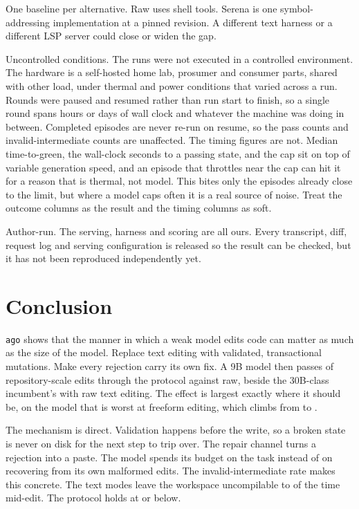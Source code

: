 \documentclass[11pt]{article}
\begin{document}
One baseline per alternative. Raw uses shell tools. Serena is one
symbol-addressing implementation at a pinned revision. A different text
harness or a different LSP server could close or widen the gap.

Uncontrolled conditions. The runs were not executed in a controlled
environment. The hardware is a self-hosted home lab, prosumer and
consumer parts, shared with other load, under thermal and power
conditions that varied across a run.
Rounds were paused and resumed rather than run start to finish, so a
single round spans hours or days of wall clock and whatever the machine
was doing in between. Completed episodes are never re-run on resume, so
the pass counts and invalid-intermediate counts are unaffected. The
timing figures are not. Median time-to-green, the wall-clock seconds to
a passing state, and the cap sit on top of variable generation speed,
and an episode that throttles near
the cap can hit it for a reason that is thermal, not model. This bites
only the episodes already close to the limit, but where a model caps
often it is a real source of noise. Treat the outcome columns as the
result and the timing columns as soft.

Author-run. The serving, harness and scoring are all ours. Every
transcript, diff, request log and serving configuration is released so
the result can be checked, but it has not been reproduced independently
yet.

\section{Conclusion}
\texttt{ago} shows that the manner in which a weak model edits code can matter as much
as the size of the model. Replace text editing with validated, transactional
mutations. Make every rejection carry its own fix. A 9B model then
passes \QwenSemanticPass{} of repository-scale edits through the
protocol against \QwenRawPass{} raw, beside the 30B-class incumbent's
\GlmRawPass{} with raw text editing. The effect
is largest exactly where it should be, on the model that is worst at
freeform editing, which climbs from \GptOssRawPass{} to
\GptOssSemanticPass{}.

The mechanism is direct. Validation happens before the write, so a
broken state is never on disk for the next step to trip over. The
repair channel turns a rejection into a paste. The model spends its
budget on the task instead of on recovering from its own malformed
edits. The invalid-intermediate rate makes this concrete. The text
modes leave the workspace uncompilable \InvalidRawMin{} to
\InvalidRawMax{} of the time mid-edit. The protocol holds at
\InvalidSemanticMax{} or below.
\end{document}
